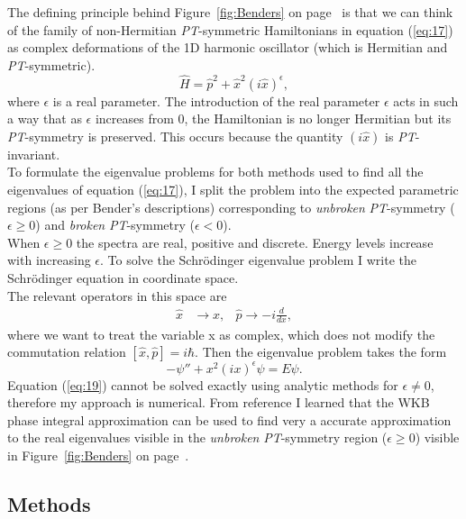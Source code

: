 \documentclass[10pt, a4paper, singlespacing, headsepline]{article}
\newcommand\PT{\textit{PT}}
\begin{document}
The defining principle behind Figure~\ref{fig:Benders} on page~\pageref{fig:Benders} is that we can think of the family of non-Hermitian \PT-symmetric Hamiltonians in equation (\ref{eq:17}) as complex deformations of the 1D harmonic oscillator (which is Hermitian and \PT-symmetric).
\begin{equation}\label{eq:17}
\hat{H} = \hat{p}^2 + \hat{x}^2 (i \hat{x})^{\epsilon},
\end{equation}
where $\epsilon$ is a real parameter. The introduction of the real parameter $\epsilon$ acts in such a way that as $\epsilon$ increases from $0$, the Hamiltonian is no longer Hermitian but its \PT-symmetry is preserved. This occurs because the quantity $(i\hat{x})$ is \PT-invariant\cite{BenderPT}\cite{Bender}.\\ 
To formulate the eigenvalue problems for both methods used to find all the eigenvalues of equation (\ref{eq:17}), I split the problem into the expected parametric regions (as per Bender's descriptions) corresponding to \textit{unbroken} \PT-symmetry ($\epsilon \geq 0$) and \textit{broken} \PT-symmetry ($\epsilon < 0$).\\
When $\epsilon \geq 0$ the spectra are real, positive and discrete. Energy levels increase with increasing $\epsilon$.
To solve the Schrödinger eigenvalue problem I write the Schrödinger equation in coordinate space.\\ The relevant operators in this space are
\begin{align} \label{eq:18}
\hat{x}& \rightarrow x,  &\hat{p}\rightarrow -i \frac{d}{dx},
\end{align}
where we want to treat the variable x as complex, which does not modify the commutation relation $[\hat{x}, \hat{p}] = i\hbar$. Then the eigenvalue problem takes the form
\begin{equation}\label{eq:19}
-\psi'' + x^2 (i x)^{\epsilon} \psi = E \psi.
\end{equation}
Equation (\ref{eq:19}) cannot be solved exactly using analytic methods for $\epsilon \neq 0$, therefore my approach is numerical. From reference \cite{Bender} I learned that the WKB phase integral approximation can be used to find very a accurate approximation to the real eigenvalues visible in the \textit{unbroken} \PT-symmetry region ($\epsilon \geq 0$) visible in Figure~\ref{fig:Benders} on page~\pageref{fig:Benders}. 

\subsection{Methods}
\end{document}
